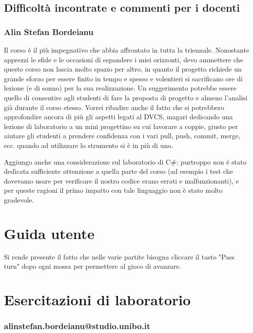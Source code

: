 \documentclass[a4paper,12pt]{report}
\begin{document}
\section{Difficoltà incontrate e commenti per i docenti}

\subsection{Alin Stefan Bordeianu}
Il corso è il più impegnativo che abbia affrontato in tutta la triennale. Nonostante apprezzi le sfide e le occasioni di espandere i miei orizzonti, devo ammettere che questo corso non lascia molto spazio per altro, in quanto il progetto richiede un grande sforzo per essere finito in tempo e spesso e volentieri si sacrificano ore di lezione (e di sonno) per la sua realizzazione. Un suggerimento potrebbe essere quello di consentire agli studenti di fare la proposta di progetto e almeno l'analisi già durante il corso stesso. Vorrei ribadire anche il fatto che si potrebbero approfondire ancora di più gli aspetti legati al DVCS, magari dedicando una lezione di laboratorio a un mini progettino su cui lavorare a coppie, giusto per aiutare gli studenti a prendere confidenza con i vari pull, push, commit, merge, ecc. quando ad utilizzare lo strumento si è in più di uno.

Aggiungo anche una considerazione sul laboratorio di C\#: purtroppo non è stato dedicata sufficiente attenzione a quella parte del corso (ad esempio i test che dovevamo usare per verificare il nostro codice erano errati e malfunzionanti), e per queste ragioni il primo impatto con tale linguaggio non è stato molto gradevole.


\appendix

\chapter{Guida utente}

Si rende presente il fatto che nelle varie partite bisogna cliccare il tasto "Pass turn" dopo ogni mossa per permettere al gioco di avanzare.

\chapter{Esercitazioni di laboratorio}

\subsection{alinstefan.bordeianu@studio.unibo.it}
\end{document}
